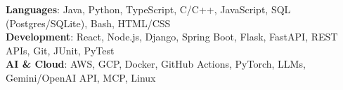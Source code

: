 \begin{itemize}[leftmargin=0.15in, label={}]
    \small{\item{
     \textbf{Languages}{: Java, Python, TypeScript, C/C++, JavaScript, SQL (Postgres/SQLite), Bash, HTML/CSS} \\
     \textbf{Development}{: React, Node.js, Django, Spring Boot, Flask, FastAPI, REST APIs, Git, JUnit, PyTest} \\
     \textbf{AI \& Cloud}{: AWS, GCP, Docker, GitHub Actions, PyTorch, LLMs, Gemini/OpenAI API, MCP, Linux}
    }}
\end{itemize}
